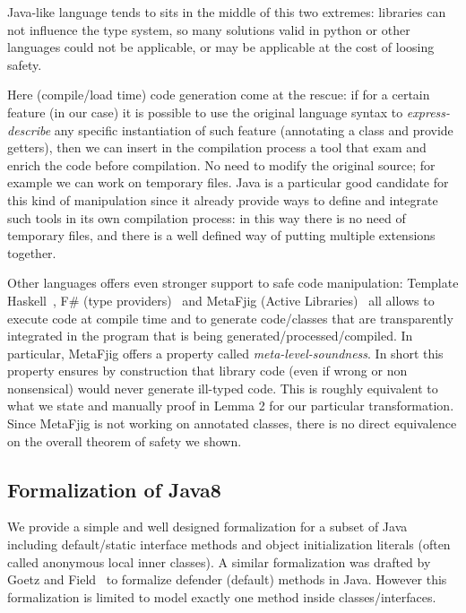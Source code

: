 Java-like language tends to sits in the middle of this two extremes:
libraries can not influence the type system, so many solutions valid in python or other languages could not be applicable, or may be applicable at the cost of loosing safety.

Here (compile/load time) code generation come at the rescue: 
if for a certain feature (\mixin in our case) it is possible to use the original language syntax to
\emph{express-describe} any specific instantiation of such feature
(annotating a class and provide getters), then we can insert in the compilation process a tool that exam and enrich the code before compilation. No need to modify the original source; for example we can work on temporary files.
Java is a particular good candidate for this kind of manipulation since it already provide ways to define and integrate such tools in its own compilation process: in this way there is no need of temporary files, and there is a well defined way of putting multiple extensions together.

Other languages offers even stronger support to safe code manipulation:
Template Haskell~\cite{}, F\# (type providers)~\cite{} and MetaFjig (Active Libraries)~\cite{}
all allows to execute code at compile time and to generate code/classes that are transparently integrated in the program that is being generated/processed/compiled.
In particular, MetaFjig offers a property called \emph{meta-level-soundness}. In short this property ensures by construction that library code (even if wrong or non nonsensical) would never generate ill-typed code. This is roughly equivalent to what we state and manually proof in Lemma 2 for our particular transformation.
Since MetaFjig is not working on annotated classes, there is no direct equivalence on the overall theorem of safety we shown.

\subsection{Formalization of Java8}
We provide a simple and well designed formalization for a subset of Java including default/static interface methods and object initialization literals (often called anonymous local inner classes).
A similar formalization was drafted by
Goetz and Field~\cite{goetz12fdefenders} to formalize defender (default) methods
in Java. However this formalization is limited to model exactly one
method inside classes/interfaces.

